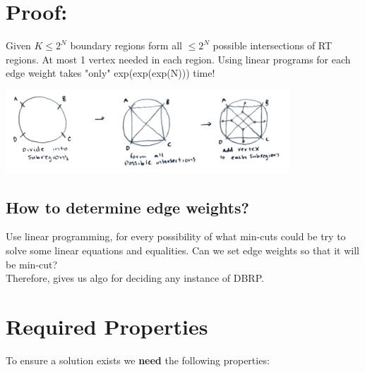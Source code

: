 \documentclass[12pt]{article}
\begin{document}
\section*{Proof:}
Given $K\leq2^N$ boundary regions form all $\leq2^N$ possible intersections of RT regions. At most 1 vertex needed in each region. Using linear programs for each edge weight takes "only" exp(exp(exp(N))) time!

\begin{center}
    \includegraphics[width=0.8\textwidth]{subregions.png}
\end{center}

\subsection*{How to determine edge weights?}
Use linear programming, for every possibility of what min-cuts could be try to solve some linear equations and equalities. Can we set edge weights so that it will be min-cut?
\\Therefore, gives us algo for deciding any instance of DBRP.

\section*{Required Properties}
To ensure a solution exists we \textbf{need} the following properties:
\end{document}
